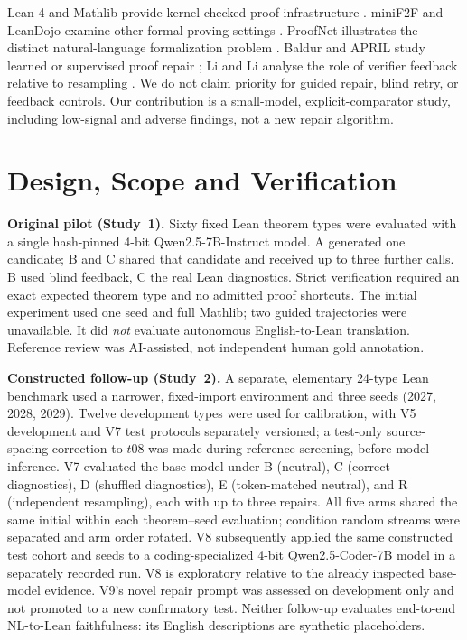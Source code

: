 \documentclass[runningheads,a4paper]{llncs}
\begin{document}
Lean 4 and Mathlib provide kernel-checked proof infrastructure
\cite{lean4,mathlib}. miniF2F and LeanDojo examine other formal-proving
settings \cite{minif2f,leandojo}. ProofNet illustrates the distinct
natural-language formalization problem \cite{proofnet}. Baldur and APRIL
study learned or supervised proof repair \cite{baldur,april}; Li and Li
analyse the role of verifier feedback relative to resampling
\cite{hindsight}. We do not claim priority for guided repair, blind retry,
or feedback controls. Our contribution is a small-model, explicit-comparator
study, including low-signal and adverse findings, not a new repair algorithm.

\section{Design, Scope and Verification}
\textbf{Original pilot (Study~1).} Sixty fixed Lean theorem types were evaluated
with a single hash-pinned 4-bit Qwen2.5-7B-Instruct model. A generated one
candidate; B and C shared that candidate and received up to three further
calls. B used blind feedback, C the real Lean diagnostics. Strict verification
required an exact expected theorem type and no admitted proof shortcuts.
The initial experiment used one seed and full Mathlib; two guided trajectories
were unavailable. It did \emph{not} evaluate autonomous English-to-Lean translation.
Reference review was AI-assisted, not independent human gold annotation.

\textbf{Constructed follow-up (Study~2).} A separate, elementary 24-type Lean
benchmark used a narrower, fixed-import environment and three seeds (2027,
2028, 2029). Twelve development types were used for calibration, with
V5 development and V7 test protocols separately versioned; a test-only
source-spacing correction to $t08$ was made during reference screening,
before model inference. V7 evaluated the base model under B (neutral), C
(correct diagnostics), D (shuffled diagnostics), E (token-matched neutral),
and R (independent resampling), each with up to three repairs. All five
arms shared the same initial within each theorem--seed evaluation; condition
random streams were separated and arm order rotated. V8 subsequently applied
the same constructed test cohort and seeds to a coding-specialized 4-bit
Qwen2.5-Coder-7B model in a separately recorded run. V8 is exploratory
relative to the already inspected base-model evidence. V9's novel repair
prompt was assessed on development only and not promoted to a new confirmatory
test. Neither follow-up evaluates end-to-end NL-to-Lean faithfulness: its
English descriptions are synthetic placeholders.
\end{document}
